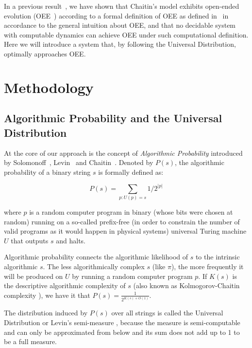 \documentclass[10pt]{article}
\begin{document}
In a previous result~\cite{Hernandez2016}, we have shown that Chaitin's model exhibits open-ended evolution (OEE~\cite{Bedau98}) according to a formal definition of OEE as defined in~\cite{Hernandez2016} in accordance to the general intuition about OEE, and that no decidable system with computable dynamics can achieve OEE under such computational definition. Here we will introduce a system that, by following the Universal Distribution, optimally approaches OEE.



\section{Methodology}

\subsection{Algorithmic Probability and the Universal Distribution}

At the core of our approach is the concept of \textit{Algorithmic Probability} introduced by Solomonoff~\cite{solomonoff}, Levin~\cite{levin} and Chaitin~\cite{chaitin66}. Denoted by $P(s)$, the algorithmic probability of a binary string $s$ is formally defined as:

\begin{equation}
\label{m}
P(s) = \sum_{p:U(p) = s} 1/2^{|p|}
\end{equation}


\noindent where $p$ is a random computer program in binary (whose bits were chosen at random) running on a so-called prefix-free (in order to constrain the number of valid programs as it would happen in physical systems) universal Turing machine $U$ that outputs $s$ and halts.

Algorithmic probability connects the algorithmic likelihood of $s$ to the intrinsic algorithmic $s$. The less algorithmically complex $s$ (like $\pi$), the more frequently it will be produced on $U$ by running a random computer program $p$. If $K(s)$ is the descriptive algorithmic complexity of $s$ (also known as Kolmogorov-Chaitin complexity \cite{Kolmogorov,Chaitin74}), we have it that $P(s)=\frac{1}{2^{K(s)+O(1)}}$.

The distribution induced by $P(s)$ over all strings is called the Universal Distribution or Levin's semi-measure \cite{kirchherr1997miraculous,Solomonof03,codTeoDist}, because the measure is semi-computable and can only be approximated from below and its sum does not add up to 1 to be a full measure.
\end{document}
